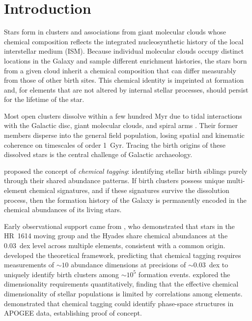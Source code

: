 \documentclass[fleqn,usenatbib]{mnras}
\begin{document}
\section{Introduction}
\label{sec:intro}

Stars form in clusters and associations from giant molecular clouds whose chemical composition reflects the integrated nucleosynthetic history of the local interstellar medium (ISM).
Because individual molecular clouds occupy distinct locations in the Galaxy and sample different enrichment histories, the stars born from a given cloud inherit a chemical composition that can differ measurably from those of other birth sites.
This chemical identity is imprinted at formation and, for elements that are not altered by internal stellar processes, should persist for the lifetime of the star.

Most open clusters dissolve within a few hundred Myr due to tidal interactions with the Galactic disc, giant molecular clouds, and spiral arms \citep{BinneyTremaine2008, Meingast2019}.
Their former members disperse into the general field population, losing spatial and kinematic coherence on timescales of order 1~Gyr.
Tracing the birth origins of these dissolved stars is the central challenge of Galactic archaeology.

\citet{Freeman2002} proposed the concept of \emph{chemical tagging}: identifying stellar birth siblings purely through their shared abundance patterns.
If birth clusters possess unique multi-element chemical signatures, and if these signatures survive the dissolution process, then the formation history of the Galaxy is permanently encoded in the chemical abundances of its living stars.

Early observational support came from \citet{DeSilva2006, DeSilva2007}, who demonstrated that stars in the HR~1614 moving group and the Hyades share chemical abundances at the 0.03~dex level across multiple elements, consistent with a common origin.
\citet{BlandHawthorn2010} developed the theoretical framework, predicting that chemical tagging requires measurements of ${\sim}10$ abundance dimensions at precisions of ${\sim}0.03$~dex to uniquely identify birth clusters among ${\sim}10^5$ formation events.
\citet{Ting2015} explored the dimensionality requirements quantitatively, finding that the effective chemical dimensionality of stellar populations is limited by correlations among elements.
\citet{Hogg2016} demonstrated that chemical tagging could identify phase-space structures in APOGEE data, establishing proof of concept.
\end{document}
